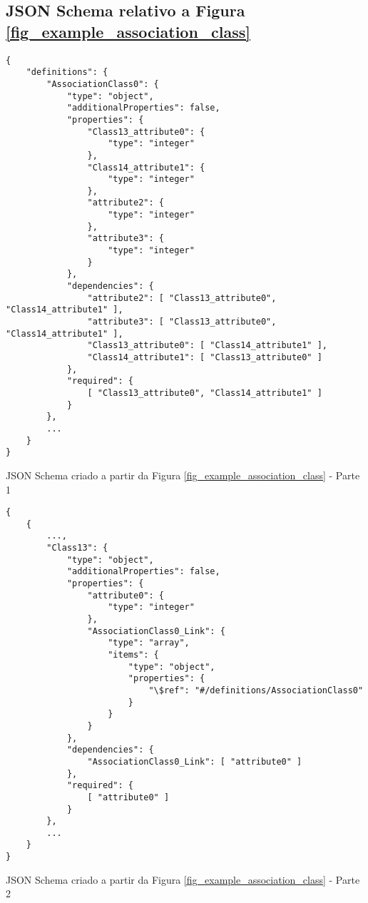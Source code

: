\begin{anexosenv}

\chapter{JSON Schema relativo a Figura \ref{fig_example_association_class}}
\label{fig_example_association_class_j}

\begin{listing}
\begin{verbatim}
{
    "definitions": {
        "AssociationClass0": {
            "type": "object",
            "additionalProperties": false,
            "properties": {
                "Class13_attribute0": {
                    "type": "integer"
                },
                "Class14_attribute1": {
                    "type": "integer"
                },
                "attribute2": {
                    "type": "integer"
                },
                "attribute3": {
                    "type": "integer"
                }
            },
            "dependencies": {
                "attribute2": [ "Class13_attribute0", "Class14_attribute1" ],
                "attribute3": [ "Class13_attribute0", "Class14_attribute1" ],
                "Class13_attribute0": [ "Class14_attribute1" ],
                "Class14_attribute1": [ "Class13_attribute0" ]
            },
            "required": {
                [ "Class13_attribute0", "Class14_attribute1" ]
            }
        },
        ...
    }
}
\end{verbatim}
\caption{JSON Schema criado a partir da Figura \ref{fig_example_association_class} - Parte 1}
\end{listing}

\begin{listing}
\begin{verbatim}
{
    {
        ...,
        "Class13": {
            "type": "object",
            "additionalProperties": false,
            "properties": {
                "attribute0": {
                    "type": "integer"
                },
                "AssociationClass0_Link": {
                    "type": "array",
                    "items": {
                        "type": "object",
                        "properties": {
                            "\$ref": "#/definitions/AssociationClass0"
                        }
                    }
                }
            },
            "dependencies": {
                "AssociationClass0_Link": [ "attribute0" ]
            },
            "required": {
                [ "attribute0" ]
            }
        },
        ...
    }
}
\end{verbatim}
\caption{JSON Schema criado a partir da Figura \ref{fig_example_association_class} - Parte 2}
\end{listing}


\end{anexosenv}
